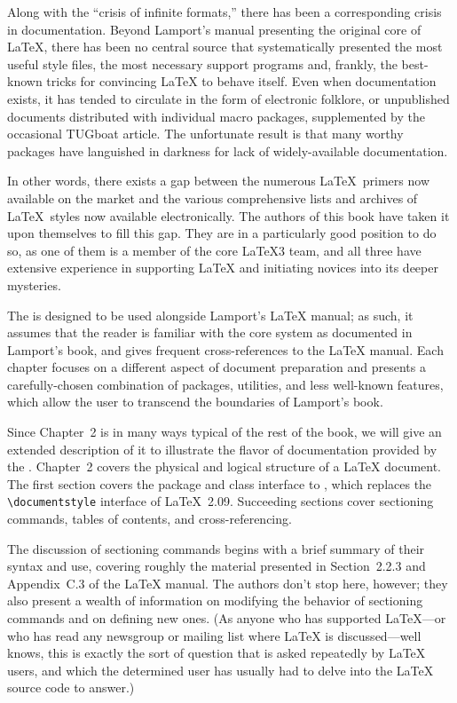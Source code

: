 Along with the ``crisis of infinite formats,'' there has been a
corresponding crisis in documentation.  Beyond Lamport's manual
presenting the original core of \LaTeX, there has been no central
source that systematically presented the most useful style files, the
most necessary support programs and, frankly, the best-known tricks
for convincing \LaTeX{} to behave itself.  Even when documentation
exists, it has tended to circulate in the form of electronic folklore,
or unpublished documents distributed with individual macro packages,
supplemented by the occasional TUGboat article.  The unfortunate
result is that many worthy packages have languished in darkness for
lack of widely-available documentation.

In other words, there exists a gap between the numerous \LaTeX\
primers now available on the market and the various comprehensive
lists and archives of \LaTeX\ styles now available electronically.
The authors of this book have taken it upon themselves to fill this
gap.  They are in a particularly good position to do so, as one of
them is a member of the core \LaTeX3 team, and all three have
extensive experience in supporting \LaTeX{} and initiating novices
into its deeper mysteries.

The  is designed to be used alongside Lamport's
\LaTeX{} manual; as such, it assumes that the reader is familiar with
the core system as documented in Lamport's book, and gives frequent
cross-references to the \LaTeX{} manual.  Each chapter focuses on a
different aspect of document preparation and presents a
carefully-chosen combination of packages, utilities, and less
well-known features, which allow the user to transcend the boundaries
of Lamport's book.

Since Chapter~2 is in many ways typical of the rest of the book, we
will give an extended description of it to illustrate the flavor of
documentation provided by the \booktitle{Companion}.  Chapter~2 covers
the physical and logical structure of a \LaTeX{} document.  The first
section covers the package and class interface to \LaTeXe, which
replaces the \verb+\documentstyle+ interface of \LaTeX~2.09.
Succeeding sections cover sectioning commands, tables of contents, and
cross-referencing.

The discussion of sectioning commands begins with a brief summary of
their syntax and use, covering roughly the material presented in
Section~2.2.3 and Appendix~C.3 of the \LaTeX{} manual.  The authors
don't stop here, however; they also present a wealth of information on
modifying the behavior of sectioning commands and on defining new
ones.  (As anyone who has supported
\LaTeX{}---or who has read any newsgroup or mailing list where
\LaTeX{} is discussed---well knows, this is exactly the sort of
question that is asked repeatedly by \LaTeX{} users, and which the
determined user has usually had to delve into the
\LaTeX{} source code to answer.)

